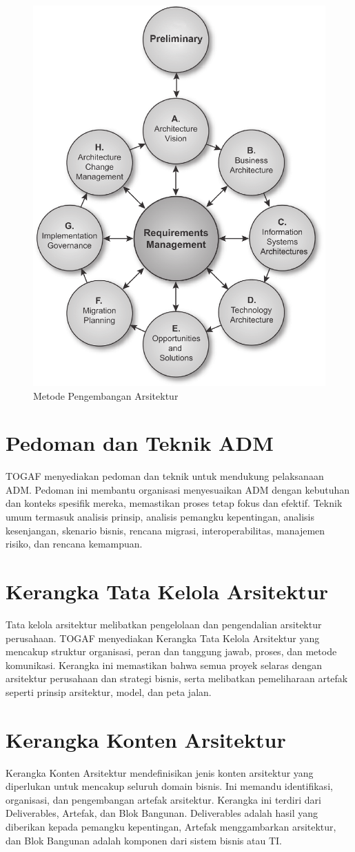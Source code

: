 \begin{figure}
	\begin{center}
		\includegraphics[width=.50\textwidth]{../figures/architecture_development_method}
		\caption{Metode Pengembangan Arsitektur}
	\end{center}
\end{figure}

\section{Pedoman dan Teknik ADM}
TOGAF menyediakan pedoman dan teknik untuk mendukung pelaksanaan ADM. Pedoman ini membantu organisasi menyesuaikan ADM dengan kebutuhan dan konteks spesifik mereka, memastikan proses tetap fokus dan efektif. Teknik umum termasuk analisis prinsip, analisis pemangku kepentingan, analisis kesenjangan, skenario bisnis, rencana migrasi, interoperabilitas, manajemen risiko, dan rencana kemampuan.

\section{Kerangka Tata Kelola Arsitektur}
Tata kelola arsitektur melibatkan pengelolaan dan pengendalian arsitektur perusahaan. TOGAF menyediakan Kerangka Tata Kelola Arsitektur yang mencakup struktur organisasi, peran dan tanggung jawab, proses, dan metode komunikasi. Kerangka ini memastikan bahwa semua proyek selaras dengan arsitektur perusahaan dan strategi bisnis, serta melibatkan pemeliharaan artefak seperti prinsip arsitektur, model, dan peta jalan.

\section{Kerangka Konten Arsitektur}
Kerangka Konten Arsitektur mendefinisikan jenis konten arsitektur yang diperlukan untuk mencakup seluruh domain bisnis. Ini memandu identifikasi, organisasi, dan pengembangan artefak arsitektur. Kerangka ini terdiri dari Deliverables, Artefak, dan Blok Bangunan. Deliverables adalah hasil yang diberikan kepada pemangku kepentingan, Artefak menggambarkan arsitektur, dan Blok Bangunan adalah komponen dari sistem bisnis atau TI.

